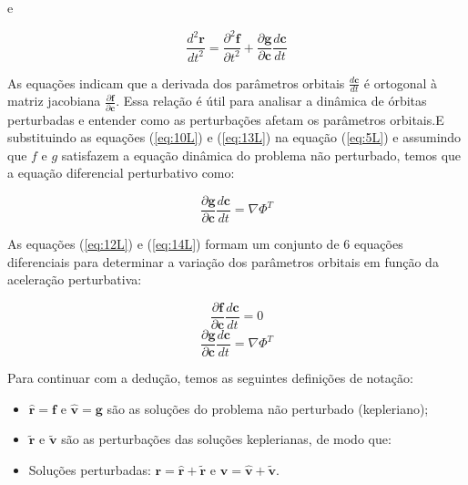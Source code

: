 e

\begin{equation}
\frac{d^2\mathbf r}{dt^2}=\frac{\partial^2\mathbf f}{\partial t^2}+\frac{\partial\mathbf g}{\partial\mathbf c}\frac{d\mathbf c}{dt}  
\label{eq:13L}
\end{equation}

\par As equações indicam que a derivada dos parâmetros orbitais $\frac{d\mathbf{c}}{dt}$ é ortogonal à matriz jacobiana $\frac{\partial\mathbf{f}}{\partial\mathbf{c}}$. Essa relação é útil para analisar a dinâmica de órbitas perturbadas e entender como as perturbações afetam os parâmetros orbitais.E substituindo as equações (\ref{eq:10L}) e (\ref{eq:13L}) na equação (\ref{eq:5L}) e assumindo que $f$ e $g$ satisfazem a equação dinâmica do problema não perturbado, temos que a equação diferencial perturbativo como: 

\begin{equation}
{\frac{\partial\mathbf{g}}{\partial\mathbf{c}}}{\frac{d\mathbf{c}}{d t}}=\nabla\Phi^{T}
\label{eq:14L}
\end{equation}

\par As equações (\ref{eq:12L}) e (\ref{eq:14L})  formam um conjunto de 6 equações diferenciais para determinar a variação dos parâmetros orbitais em função da aceleração perturbativa:

\begin{equation}
 \frac{\partial\mathbf f}{\partial\mathbf c}\frac{d\mathbf c}{dt}=0
 \label{eq:15L}
\end{equation}
\begin{equation}
 \frac{\partial\mathbf{g}}{\partial\mathbf{c}}\frac{d\mathbf{c}}{dt}=\nabla\Phi^T   
 \label{eq:16L}
\end{equation}

\par Para continuar com a dedução, temos as seguintes definições de notação:
\begin{itemize}
    \item $\hat{\mathbf{r}} = \mathbf{f}$ e $\hat{\mathbf{v}} = \mathbf{g}$ são as soluções do problema não perturbado (kepleriano);
    \item $\tilde{\mathbf{r}}$ e $\tilde{\mathbf{v}}$ são as perturbações das soluções keplerianas, de modo que:
    \item Soluções perturbadas: $\mathbf{r} = \hat{\mathbf{r}} + \tilde{\mathbf{r}}$ e $\mathbf{v} = \hat{\mathbf{v}} + \tilde{\mathbf{v}}$.
\end{itemize}

